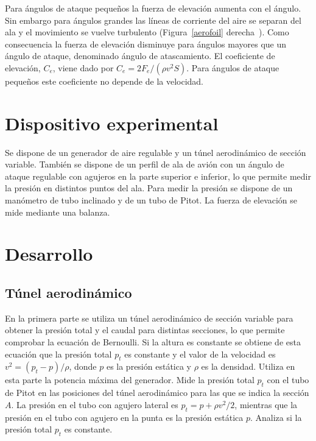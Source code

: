 \documentclass[11pt]{articulo}
\begin{document}
Para \'angulos de ataque peque\~nos la fuerza de elevaci\'on aumenta con el \'angulo. Sin embargo para \'angulos grandes las l\'ineas de corriente del aire se separan del ala y el movimiento se vuelve turbulento (Figura~\ref{aerofoil} derecha~\cite{babinsky}). Como consecuencia la fuerza de elevaci\'on disminuye para \'angulos mayores que un \'angulo de ataque, denominado \'angulo de atascamiento. El coeficiente de elevaci\'on, $C_e$, viene dado por $C_e = 2 F_e / (\rho v^2 S)$. Para \'angulos de ataque peque\~nos este coeficiente no depende de la velocidad.


\section{Dispositivo experimental}

Se dispone de un generador de aire regulable y un t\'unel aerodin\'amico de secci\'on variable. Tambi\'en se dispone de un perfil de ala de avi\'on con un \'angulo de ataque regulable con agujeros en la parte superior e inferior, lo que permite medir la presi\'on en distintos puntos del ala. Para medir la presi\'on se dispone de un man\'ometro de tubo inclinado y de un tubo de Pitot. La fuerza de elevaci\'on se mide mediante una balanza.


\section{Desarrollo}

\subsection{T\'unel aerodin\'amico}

En la primera parte se utiliza un t\'unel aerodin\'amico de secci\'on variable para obtener la presi\'on total y el caudal para distintas secciones, lo que permite comprobar la ecuaci\'on de Bernoulli. Si la altura es constante se obtiene de esta ecuaci\'on que la presi\'on total $p_t$ es constante y el valor de la velocidad es $v^2 = (p_t - p) / \rho$, donde $p$ es la presi\'on est\'atica y $\rho$ es la densidad. Utiliza en esta parte la potencia m\'axima del generador. Mide la presi\'on total $p_t$ con el tubo de Pitot en las posiciones del t\'unel aerodin\'amico para las que se indica la secci\'on $A$. La presi\'on en el tubo con agujero lateral es $p_t = p + \rho v^2 / 2$, mientras que la presi\'on en el tubo con agujero en la punta es la presi\'on est\'atica $p$. Analiza si la presi\'on total $p_t$ es constante.
\end{document}
